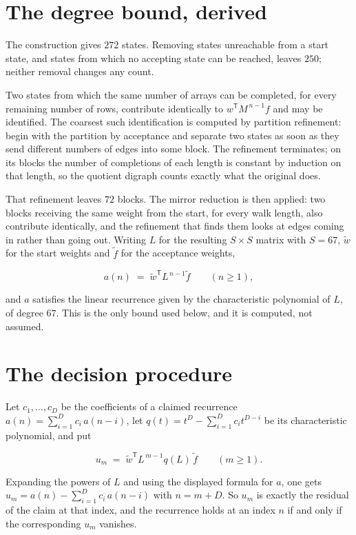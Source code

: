 \documentclass[11pt]{article}
\theoremstyle{definition}
\begin{document}
\section{The degree bound, derived}

The construction gives $272$ states. Removing states unreachable from a start state, and states from which no accepting state can be reached, leaves $250$; neither removal changes any count.

Two states from which the same number of arrays can be completed, for every remaining number of rows, contribute identically to $w^{\mathsf T}M^{\,n-1}f$ and may be identified. The coarsest such identification is computed by partition refinement: begin with the partition by acceptance and separate two states as soon as they send different numbers of edges into some block. The refinement terminates; on its blocks the number of completions of each length is constant by induction on that length, so the quotient digraph counts exactly what the original does.

That refinement leaves $72$ blocks. The mirror reduction is then applied: two blocks receiving the same weight from the start, for every walk length, also contribute identically, and the refinement that finds them looks at edges coming in rather than going out. Writing $L$ for the resulting $S \times S$ matrix with $S = 67$, $\tilde w$ for the start weights and $\tilde f$ for the acceptance weights,

\[a(n) \;=\; \tilde w^{\mathsf T} L^{\,n-1} \tilde f \qquad (n \ge 1),\]

and $a$ satisfies the linear recurrence given by the characteristic polynomial of $L$, of degree $67$. This is the only bound used below, and it is computed, not assumed.

\section{The decision procedure}

Let $c_1,\dots,c_D$ be the coefficients of a claimed recurrence $a(n) = \sum_{i=1}^{D} c_i\,a(n-i)$, let $q(t) = t^{D} - \sum_{i=1}^{D} c_i t^{D-i}$ be its characteristic polynomial, and put

\[u_m \;=\; \tilde w^{\mathsf T} L^{\,m-1} q(L)\,\tilde f \qquad (m \ge 1).\]

Expanding the powers of $L$ and using the displayed formula for $a$, one gets $u_m = a(n) - \sum_{i=1}^{D} c_i\,a(n-i)$ with $n = m + D$. So $u_m$ is exactly the residual of the claim at that index, and the recurrence holds at an index $n$ if and only if the corresponding $u_m$ vanishes.
\end{document}
